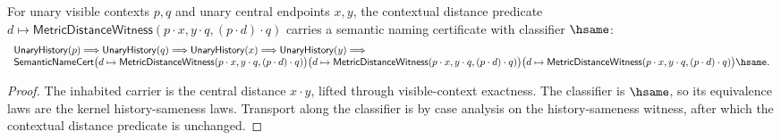\begin{theorem}
\label{thm:metric-distance-witness-visible-context-semantic-namecert}
For unary visible contexts $p,q$ and unary central endpoints $x,y$, the
contextual distance predicate
$d\mapsto\mathsf{MetricDistanceWitness}(p\cdot x,y\cdot q,(p\cdot d)\cdot q)$
carries a semantic naming certificate with classifier $\hsame$:
$$
\begin{array}{l}
\mathsf{UnaryHistory}(p)\Longrightarrow
\mathsf{UnaryHistory}(q)\Longrightarrow
\mathsf{UnaryHistory}(x)\Longrightarrow
\mathsf{UnaryHistory}(y)\Longrightarrow
\\
\mathsf{SemanticNameCert}
\bigl(d\mapsto\mathsf{MetricDistanceWitness}(p\cdot x,y\cdot q,(p\cdot d)\cdot q)\bigr)
\bigl(d\mapsto\mathsf{MetricDistanceWitness}(p\cdot x,y\cdot q,(p\cdot d)\cdot q)\bigr)
\bigl(d\mapsto\mathsf{MetricDistanceWitness}(p\cdot x,y\cdot q,(p\cdot d)\cdot q)\bigr)
\hsame .
\end{array}
$$
\end{theorem}
\begin{proof}
The inhabited carrier is the central distance $x\cdot y$, lifted through
visible-context exactness. The classifier is $\hsame$, so its equivalence laws
are the kernel history-sameness laws. Transport along the classifier is by
case analysis on the history-sameness witness, after which the contextual
distance predicate is unchanged.
\end{proof}
